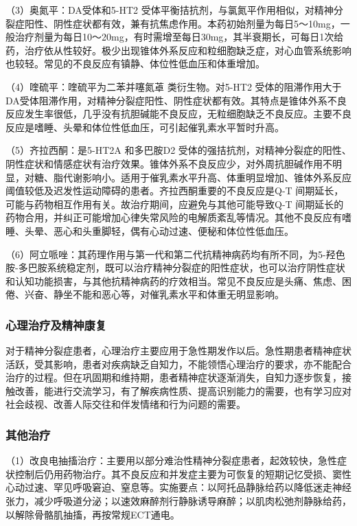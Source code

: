 （3）奥氮平：DA受体和5-HT{2}
受体平衡拮抗剂，与氯氮平作用相似，对精神分裂症阳性、阴性症状都有效，兼有抗焦虑作用。本药初始剂量为每日5～10mg，一般治疗剂量为每日10～20mg，有时需增至每日30mg，其半衰期长，可每日1次给药，治疗依从性较好。极少出现锥体外系反应和粒细胞缺乏症，对心血管系统影响也较轻。常见的不良反应有镇静、体位性低血压和体重增加。

（4）喹硫平：喹硫平为二苯并噻氮䓬
类衍生物。对5-HT{2}
受体的阻滞作用大于DA受体阻滞作用，对精神分裂症阳性、阴性症状都有效。其特点是锥体外系不良反应发生率很低，几乎没有抗胆碱能不良反应，无粒细胞缺乏不良反应。主要不良反应是嗜睡、头晕和体位性低血压，可引起催乳素水平暂时升高。

（5）齐拉西酮：是5-HT{2A} 和多巴胺D{2}
受体的强拮抗剂，对精神分裂症的阳性、阴性症状和情感症状有治疗效果。锥体外系不良反应少，对外周抗胆碱作用不明显，对糖、脂代谢影响小。适用于催乳素水平升高、体重明显增加、锥体外系反应阈值较低及迟发性运动障碍的患者。齐拉西酮重要的不良反应是{Q-T}
间期延长，可能与药物相互作用有关。故治疗期间，应避免与其他可能导致{Q-T}
间期延长的药物合用，并纠正可能增加心律失常风险的电解质紊乱等情况。其他不良反应有嗜睡、头晕、恶心和头重脚轻，偶有心动过速、便秘和体位性低血压。

（6）阿立哌唑：其药理作用与第一代和第二代抗精神病药均有所不同，为5-羟色胺-多巴胺系统稳定剂，既可以治疗精神分裂症的阳性症状，也可以治疗阴性症状和认知功能损害，与其他抗精神病药的疗效相当。常见不良反应是头痛、焦虑、困倦、兴奋、静坐不能和恶心等，对催乳素水平和体重无明显影响。

\subsubsection{心理治疗及精神康复}

对于精神分裂症患者，心理治疗主要应用于急性期发作以后。急性期患者精神症状活跃，受其影响，患者对疾病缺乏自知力，不能领悟心理治疗的要求，亦不能配合治疗的过程。但在巩固期和维持期，患者精神症状逐渐消失，自知力逐步恢复，接触改善，能进行交流学习，有了解疾病性质、提高识别能力的需要，也有学习应对社会歧视、改善人际交往和伴发情绪和行为问题的需要。

\subsubsection{其他治疗}

（1）改良电抽搐治疗：主要用以部分难治性精神分裂症患者，起效较快，急性症状控制后仍用药物治疗。其不良反应和并发症主要为可恢复的短期记忆受损、窦性心动过速、罕见呼吸窘迫、窒息等。实施要点：以阿托品静脉给药以降低迷走神经张力，减少呼吸道分泌；以速效麻醉剂行静脉诱导麻醉；以肌肉松弛剂静脉给药，以解除骨骼肌抽搐，再按常规ECT通电。

